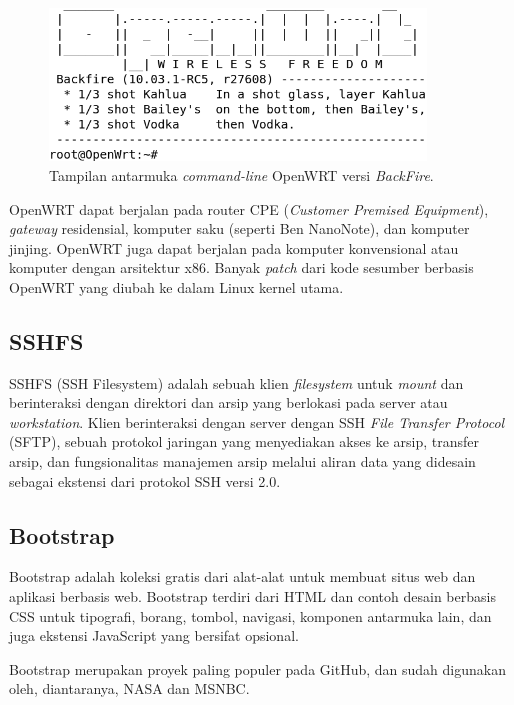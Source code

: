       \begin{figure}[ht!]
        \centering
          \includegraphics[width=10cm]{gambar/openwrt}
          \caption{Tampilan antarmuka \emph{command-line} OpenWRT versi \emph{BackFire}.}
          \label{openwrt}
      \end{figure}

    OpenWRT dapat berjalan pada router CPE (\emph{Customer Premised Equipment}), \emph{gateway} residensial, komputer saku (seperti Ben NanoNote), dan komputer jinjing. OpenWRT juga dapat berjalan pada komputer konvensional atau komputer dengan arsitektur x86. Banyak \emph{patch} dari kode sesumber berbasis OpenWRT yang diubah ke dalam Linux kernel utama.

  \subsection{SSHFS}
    SSHFS (SSH Filesystem) adalah sebuah klien \emph{filesystem} untuk \emph{mount} dan berinteraksi dengan direktori dan arsip yang berlokasi pada server atau \emph{workstation}. Klien berinteraksi dengan server dengan SSH \emph{File Transfer Protocol} (SFTP), sebuah protokol jaringan yang menyediakan akses ke arsip, transfer arsip, dan fungsionalitas manajemen arsip melalui aliran data yang didesain sebagai ekstensi dari protokol SSH versi 2.0.

  \subsection{Bootstrap}
    Bootstrap adalah koleksi gratis dari alat-alat untuk membuat situs web dan aplikasi berbasis web. Bootstrap terdiri dari HTML dan contoh desain berbasis CSS untuk tipografi, borang, tombol, navigasi, komponen antarmuka lain, dan juga ekstensi JavaScript yang bersifat opsional.

    Bootstrap merupakan proyek paling populer pada GitHub, dan sudah digunakan oleh, diantaranya, NASA dan MSNBC.

